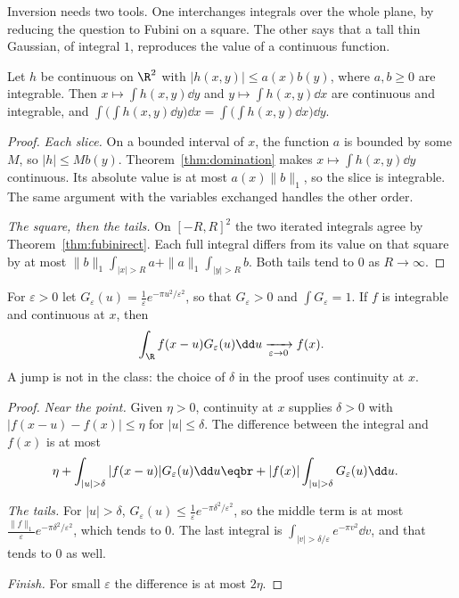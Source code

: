Inversion needs two tools. One interchanges integrals over the whole plane, by reducing the question to Fubini on a square. The other says that a tall thin Gaussian, of integral $1$, reproduces the value of a continuous function.

\begin{lemma}\label{lem:fubiniplane}
Let $h$ be continuous on $\R^2$ with $|h(x,y)|\le a(x)b(y)$, where $a,b\ge0$ are integrable. Then $x\mapsto\int h(x,y)\dd y$ and $y\mapsto\int h(x,y)\dd x$ are
continuous and integrable, and $\int\bigl(\int h(x,y)\dd y\bigr)\dd x=\int\bigl(\int h(x,y)\dd x\bigr)\dd y$.
\end{lemma}
\begin{proof}
\emph{Each slice.} On a bounded interval of $x$, the function $a$ is bounded by some $M$, so $|h|\le Mb(y)$. Theorem~\ref{thm:domination} makes $x\mapsto\int h(x,y)\dd y$ continuous. Its absolute value is at most $a(x)\|b\|_1$, so the slice is integrable. The same argument with the variables exchanged handles the other order.

\emph{The square, then the tails.} On $[-R,R]^2$ the two iterated integrals agree by Theorem~\ref{thm:fubinirect}. Each full integral differs from its value on that square by at most $\|b\|_1\int_{|x|>R}a+\|a\|_1\int_{|y|>R}b$. Both tails tend to $0$ as $R\to\infty$.
\end{proof}

\begin{lemma}\label{lem:approxid}
For $\varepsilon>0$ let $G_\varepsilon(u)=\frac1\varepsilon e^{-\pi u^2/\varepsilon^2}$, so that $G_\varepsilon>0$ and $\int G_\varepsilon=1$. If $f$ is integrable and continuous at $x$, then
\[
\int_{\R}f(x-u)G_\varepsilon(u)\dd u\xrightarrow[\varepsilon\to0]{}f(x).
\]
A jump is not in the class: the choice of $\delta$ in the proof uses continuity at $x$.
\end{lemma}
\begin{proof}
\emph{Near the point.} Given $\eta>0$, continuity at $x$ supplies $\delta>0$ with $|f(x-u)-f(x)|\le\eta$ for $|u|\le\delta$. The difference between the integral and $f(x)$ is at most
\[
\begin{aligned}\eta&+\int_{|u|>\delta}|f(x-u)|G_\varepsilon(u)\dd u\eqbr+|f(x)|\int_{|u|>\delta}G_\varepsilon(u)\dd u.\end{aligned}
\]

\emph{The tails.} For $|u|>\delta$, $G_\varepsilon(u)\le\frac1\varepsilon e^{-\pi\delta^2/\varepsilon^2}$, so the middle term is at most $\frac{\|f\|_1}\varepsilon e^{-\pi\delta^2/\varepsilon^2}$, which tends to $0$. The last integral is $\int_{|v|>\delta/\varepsilon}e^{-\pi v^2}\dd v$, and that tends to $0$ as well.

\emph{Finish.} For small $\varepsilon$ the difference is at most $2\eta$.
\end{proof}

